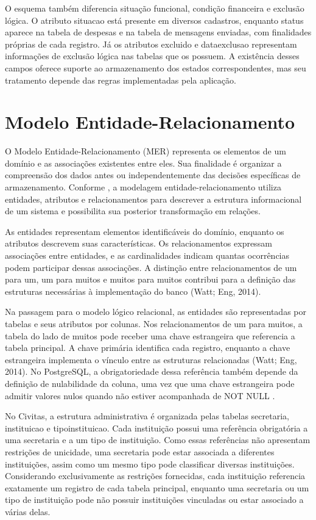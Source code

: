 O esquema também diferencia situação funcional, condição financeira e exclusão lógica. O atributo situacao está presente em diversos cadastros, enquanto status aparece na tabela de despesas e na tabela de mensagens enviadas, com finalidades próprias de cada registro. Já os atributos excluido e dataexclusao representam informações de exclusão lógica nas tabelas que os possuem. A existência desses campos oferece suporte ao armazenamento dos estados correspondentes, mas seu tratamento depende das regras implementadas pela aplicação.

\section{Modelo Entidade-Relacionamento}

O Modelo Entidade-Relacionamento (MER) representa os elementos de um domínio e as associações existentes entre eles. Sua finalidade é organizar a compreensão dos dados antes ou independentemente das decisões específicas de armazenamento. Conforme \textcite{WattEng2014}, a modelagem entidade-relacionamento utiliza entidades, atributos e relacionamentos para descrever a estrutura informacional de um sistema e possibilita sua posterior transformação em relações.

As entidades representam elementos identificáveis do domínio, enquanto os atributos descrevem suas características. Os relacionamentos expressam associações entre entidades, e as cardinalidades indicam quantas ocorrências podem participar dessas associações. A distinção entre relacionamentos de um para um, um para muitos e muitos para muitos contribui para a definição das estruturas necessárias à implementação do banco (Watt; Eng, 2014).

Na passagem para o modelo lógico relacional, as entidades são representadas por tabelas e seus atributos por colunas. Nos relacionamentos de um para muitos, a tabela do lado de muitos pode receber uma chave estrangeira que referencia a tabela principal. A chave primária identifica cada registro, enquanto a chave estrangeira implementa o vínculo entre as estruturas relacionadas (Watt; Eng, 2014). No PostgreSQL, a obrigatoriedade dessa referência também depende da definição de nulabilidade da coluna, uma vez que uma chave estrangeira pode admitir valores nulos quando não estiver acompanhada de NOT NULL \parencite{PostgreSQLConstraints2026}.

No Civitas, a estrutura administrativa é organizada pelas tabelas secretaria, instituicao e tipoinstituicao. Cada instituição possui uma referência obrigatória a uma secretaria e a um tipo de instituição. Como essas referências não apresentam restrições de unicidade, uma secretaria pode estar associada a diferentes instituições, assim como um mesmo tipo pode classificar diversas instituições. Considerando exclusivamente as restrições fornecidas, cada instituição referencia exatamente um registro de cada tabela principal, enquanto uma secretaria ou um tipo de instituição pode não possuir instituições vinculadas ou estar associado a várias delas.

